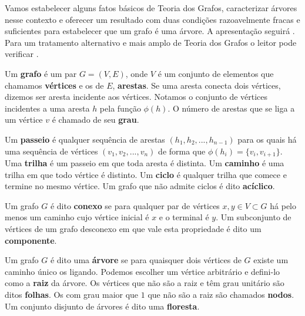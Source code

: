 Vamos estabelecer alguns fatos básicos de Teoria dos Grafos, caracterizar árvores nesse contexto e oferecer um resultado com duas condições razoavelmente fracas e suficientes para estabelecer que um grafo é uma árvore. A apresentação seguirá . Para um tratamento alternativo e mais amplo de Teoria dos Grafos o leitor pode verificar .

\begin{defi}[Grafos]
Um \textbf{grafo} é um par $G = (V, E)$, onde $V$ é um conjunto de elementos que chamamos \textbf{vértices} e os de $E$, \textbf{arestas}. Se uma aresta conecta dois vértices, dizemos ser aresta incidente aos vértices. Notamos o conjunto de vértices incidentes a uma aresta $h$ pela função $\phi(h)$. O número de arestas que se liga a um vértice $v$ é chamado de seu \textbf{grau}.
\end{defi}

\begin{defi}
Um \textbf{passeio} é qualquer sequência de arestas $(h_1, h_2, ..., h_{n-1})$ para os quais há uma sequência de vértices $(v_1, v_2, ..., v_n)$ de forma que $\phi(h_i) = \{v_i, v_{i+1}\}$. Uma \textbf{trilha} é um passeio em que toda aresta é distinta. Um \textbf{caminho} é uma trilha em que todo vértice é distinto. Um \textbf{ciclo} é qualquer trilha que comece e termine no mesmo vértice. Um grafo que não admite ciclos é dito \textbf{acíclico}.
\end{defi}

\begin{defi}[Conexidade]
Um grafo $G$ é dito \textbf{conexo} se para qualquer par de vértices $x, y \in V \subset G$ há pelo menos um caminho cujo vértice inicial é $x$ e o terminal é $y$. Um subconjunto de vértices de um grafo desconexo em que vale esta propriedade é dito um \textbf{componente}.
\end{defi}


\begin{defi}[Árvores]
Um grafo $G$ é dito uma \textbf{árvore} se para quaisquer dois vértices de $G$ existe um caminho único os ligando. Podemos escolher um vértice arbitrário e defini-lo como a \textbf{raiz} da árvore. Os vértices que não são a raiz e têm grau unitário são ditos \textbf{folhas}. Os com grau maior que $1$ que não são a raiz são chamados \textbf{nodos}. Um conjunto disjunto de árvores é dito uma \textbf{floresta}.
\end{defi}


\begin{figure}[H]
    \centering
       \label{fig:grafos}
\end{figure}


